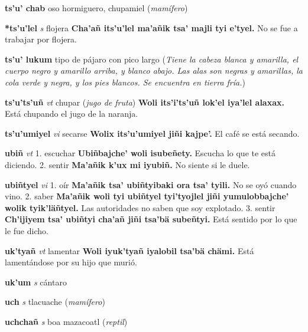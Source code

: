 \documentclass[10pt]{scrbook}
\newcommand{\entry}[1]{\textbf{#1}}
\newcommand{\alphaletter}[1]{\end{multicols}\addsec{#1}\begin{multicols}{2}}
\newcommand{\onedefinition}[1]{#1.}
\newcommand{\partofspeech}[1]{\textit{#1}}
\newcommand{\spanishtranslation}[1]{#1}
\newcommand{\clarification}[1]{(\textit{#1})}
\newcommand{\cholexample}[1]{\textbf{#1}}
\newcommand{\exampletranslation}[1]{#1}
\begin{document}
\begin{multicols}{2}
\entry{ts'u' chab}
\spanishtranslation{oso hormiguero, chupamiel}
\clarification{mamífero}

\entry{*ts'u'lel}
\partofspeech{s}
\spanishtranslation{flojera}
\cholexample{Cha'añ its'u'lel ma'añik tsa' majli tyi e'tyel.}
\exampletranslation{No se fue a trabajar por flojera.}

\entry{ts'u' lukum}
\spanishtranslation{tipo de pájaro con pico largo}
\clarification{Tiene la cabeza blanca y amarilla, el cuerpo negro y amarillo arriba, y blanco abajo. Las alas son negras y amarillas, la cola verde y negra, y los pies blancos. Se encuentra en tierra fría.}

\entry{ts'u'ts'uñ}
\partofspeech{vt}
\spanishtranslation{chupar}
\clarification{jugo de fruta}
\cholexample{Woli its'i'ts'uñ lok'el iya'lel alaxax.}
\exampletranslation{Está chupando el jugo de la naranja.}

\entry{ts'u'umiyel}
\partofspeech{vi}
\spanishtranslation{secarse}
\cholexample{Wolix its'u'umiyel jiñi kajpe'.}
\exampletranslation{El café se está secando.}

\alphaletter{U}

\entry{ubiñ}
\partofspeech{vt}
\onedefinition{1}
\spanishtranslation{escuchar}
\cholexample{Ubiñbajche' woli isubeñety.}
\exampletranslation{Escucha lo que te está diciendo.}
\onedefinition{2}
\spanishtranslation{sentir}
\cholexample{Ma'añik k'ux mi iyubiñ.}
\exampletranslation{No siente si le duele.}

\entry{ubiñtyel}
\partofspeech{vi}
\onedefinition{1}
\spanishtranslation{oír}
\cholexample{Ma'añik tsa' ubiñtyibaki ora tsa' tyili.}
\exampletranslation{No se oyó cuando vino.}
\onedefinition{2}
\spanishtranslation{saber}
\cholexample{Ma'añik woli tyi ubiñtyel tyi'tyojlel jiñi yumulobbajche' wolik tyik'läñtyel.}
\exampletranslation{Las autoridades no saben que soy explotado.}
\onedefinition{3}
\spanishtranslation{sentir}
\cholexample{Ch'ijiyem tsa' ubiñtyi cha'añ jiñi tsa'bä subeñtyi.}
\exampletranslation{Está sentido por lo que le fue dicho.}

\entry{uk'tyañ}
\partofspeech{vt}
\spanishtranslation{lamentar}
\cholexample{Woli iyuk'tyañ iyalobil tsa'bä chämi.}
\exampletranslation{Está lamentándose por su hijo que murió.}

\entry{uk'um}
\partofspeech{s}
\spanishtranslation{cántaro}

\entry{uch}
\partofspeech{s}
\spanishtranslation{tlacuache}
\clarification{mamífero}

\entry{uchchañ}
\partofspeech{s}
\spanishtranslation{boa}
\spanishtranslation{mazacoatl}
\clarification{reptil}


\end{multicols}
\end{document}
